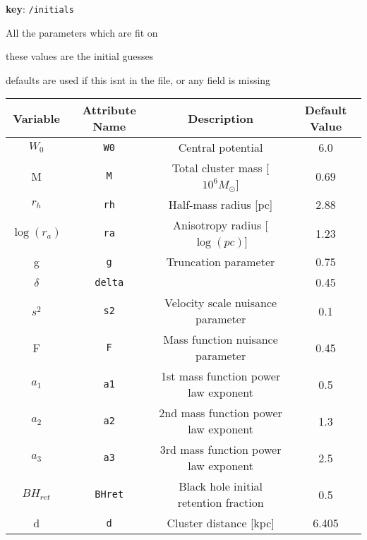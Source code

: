 
\textbf{key}: \texttt{/initials}

All the parameters which are fit on

these values are the initial guesses

defaults are used if this isnt in the file, or any field is missing


\begin{center}
\begin{tabular}{ | c | c | c | c | }
    \hline
    Variable & Attribute Name & Description & Default Value \\
    \hline\hline
    \(W_0\) & \texttt{W0} & Central potential & 6.0 \\
    \hline
    M & \texttt{M} & Total cluster mass [\(10^6 M_{\odot}\)] & 0.69 \\
    \hline
    \(r_h\) & \texttt{rh} & Half-mass radius [pc] & 2.88 \\
    \hline
    \(\log(r_a)\) & \texttt{ra} & Anisotropy radius [\(\log(pc)\)] & 1.23 \\
    \hline
    g & \texttt{g} & Truncation parameter & 0.75 \\
    \hline
    \(\delta\) & \texttt{delta} & & 0.45 \\
    \hline
    \(s^2\) & \texttt{s2} & Velocity scale nuisance parameter & 0.1 \\
    \hline
    F & \texttt{F} & Mass function nuisance parameter & 0.45 \\
    \hline
    \(a_1\) & \texttt{a1} & 1st mass function power law exponent & 0.5 \\
    \hline
    \(a_2\) & \texttt{a2} & 2nd mass function power law exponent & 1.3 \\
    \hline
    \(a_3\) & \texttt{a3} & 3rd mass function power law exponent & 2.5 \\
    \hline
    \(BH_{ret}\)&\texttt{BHret} & Black hole initial retention fraction & 0.5 \\
    \hline
    d & \texttt{d} & Cluster distance [kpc] & 6.405 \\
    \hline
\end{tabular}
\end{center}